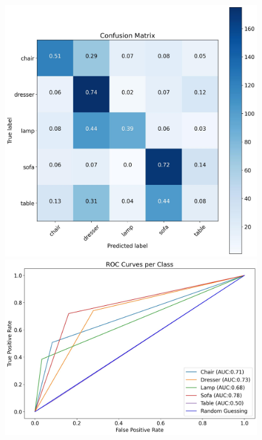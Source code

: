 \documentclass[11pt,a4paper]{article}
\begin{document}
\begin{figure}[H]
{{    \includegraphics[scale=0.13]{imgs/experiments/images/5/Experiment-5-TESTING-confusion-matrix.jpg}
    \includegraphics[scale=0.13]{imgs/experiments/images/5/Experiment-5-TESTING-ROC.jpg}
    }}
    \qquad
\end{figure}
\end{document}
